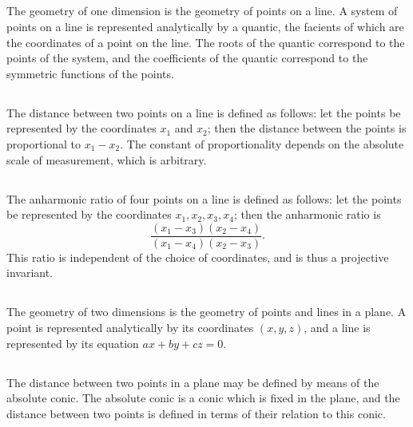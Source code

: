 \documentclass[11pt,a4paper]{book}
\begin{document}
\begin{center}
\subsection{}

The geometry of one dimension is the geometry of points on a line. A system of points on a line is represented analytically by a quantic, the facients of which are the coordinates of a point on the line. The roots of the quantic correspond to the points of the system, and the coefficients of the quantic correspond to the symmetric functions of the points.

\subsection{}

The distance between two points on a line is defined as follows: let the points be represented by the coordinates $x_1$ and $x_2$; then the distance between the points is proportional to $x_1 - x_2$. The constant of proportionality depends on the absolute scale of measurement, which is arbitrary.

\subsection{}

The anharmonic ratio of four points on a line is defined as follows: let the points be represented by the coordinates $x_1, x_2, x_3, x_4$; then the anharmonic ratio is
\[
\frac{(x_1 - x_3)(x_2 - x_4)}{(x_1 - x_4)(x_2 - x_3)}.
\]
This ratio is independent of the choice of coordinates, and is thus a projective invariant.

\subsection{}

The geometry of two dimensions is the geometry of points and lines in a plane. A point is represented analytically by its coordinates $(x, y, z)$, and a line is represented by its equation $ax + by + cz = 0$.

\subsection{}

The distance between two points in a plane may be defined by means of the absolute conic. The absolute conic is a conic which is fixed in the plane, and the distance between two points is defined in terms of their relation to this conic.


\end{center}
\end{document}
